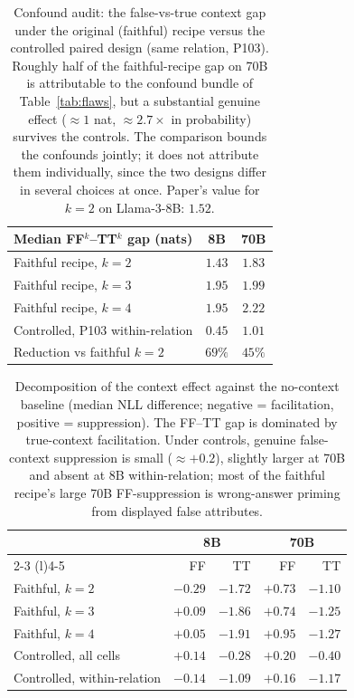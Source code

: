 \begin{table}[t]
  \centering
  \small
  \begin{tabular}{lcc}
    \toprule
    Median FF$^k$--TT$^k$ gap (nats) & 8B & 70B \\
    \midrule
    Faithful recipe, $k=2$ & $1.43$ & $1.83$ \\
    Faithful recipe, $k=3$ & $1.95$ & $1.99$ \\
    Faithful recipe, $k=4$ & $1.95$ & $2.22$ \\
    \midrule
    Controlled, P103 within-relation & $0.45$ & $1.01$ \\
    Reduction vs faithful $k=2$ & $69\%$ & $45\%$ \\
    \bottomrule
  \end{tabular}
  \caption{Confound audit: the false-vs-true context gap under the
  original (faithful) recipe versus the controlled paired design
  (same relation, P103). Roughly half of the faithful-recipe gap on
  70B is attributable to the confound bundle of
  Table~\ref{tab:flaws}, but a substantial genuine effect
  ($\approx 1$ nat, $\approx 2.7\times$ in probability) survives the
  controls. The comparison bounds the confounds jointly; it does not
  attribute them individually, since the two designs differ in several
  choices at once. Paper's value for $k=2$ on Llama-3-8B: $1.52$.}
  \label{tab:audit}
\end{table}

\begin{table}[t]
  \centering
  \small
  \begin{tabular}{lrrrr}
    \toprule
    & \multicolumn{2}{c}{8B} & \multicolumn{2}{c}{70B} \\
    \cmidrule(lr){2-3} \cmidrule(l){4-5}
    & FF & TT & FF & TT \\
    \midrule
    Faithful, $k=2$ & $-0.29$ & $-1.72$ & $+0.73$ & $-1.10$ \\
    Faithful, $k=3$ & $+0.09$ & $-1.86$ & $+0.74$ & $-1.25$ \\
    Faithful, $k=4$ & $+0.05$ & $-1.91$ & $+0.95$ & $-1.27$ \\
    \midrule
    Controlled, all cells & $+0.14$ & $-0.28$ & $+0.20$ & $-0.40$ \\
    Controlled, within-relation & $-0.14$ & $-1.09$ & $+0.16$ & $-1.17$ \\
    \bottomrule
  \end{tabular}
  \caption{Decomposition of the context effect against the no-context
  baseline (median NLL difference; negative = facilitation, positive =
  suppression). The FF--TT gap is dominated by true-context
  facilitation. Under controls, genuine false-context suppression is
  small ($\approx +0.2$), slightly larger at 70B and absent at 8B
  within-relation; most of the faithful recipe's large 70B
  FF-suppression is wrong-answer priming from displayed false
  attributes.}
  \label{tab:decomposition}
\end{table}


